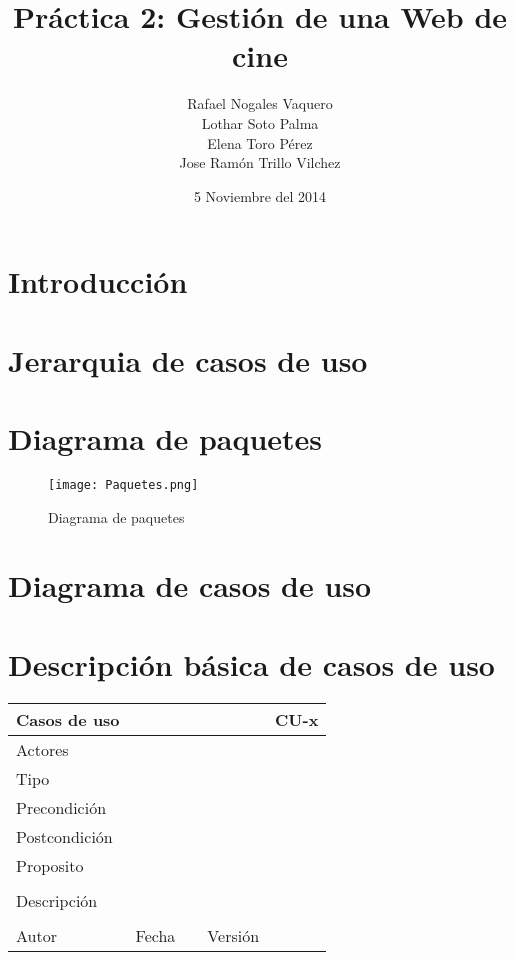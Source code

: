 \documentclass{article}
\title{Práctica 2: Gestión de una Web de cine}
\author{Rafael Nogales Vaquero
\\Lothar Soto Palma
\\Elena Toro Pérez
\\Jose Ramón Trillo Vilchez}
\date{5 Noviembre del 2014}
\begin{document}
\maketitle

\section{Introducción}
\section{Jerarquia de casos de uso}
\section{Diagrama de paquetes}
\begin{figure}[!ht]
\begin{center}
  \texttt{[image: Paquetes.png]}
  \caption{Diagrama de paquetes}
\end{center}
\end{figure}

\section{Diagrama de casos de uso}
\section{Descripción básica de casos de uso}


\begin{table}[h]
\begin{tabular}{|l|l|l|l|l|l|}
\hline
\multicolumn{2}{|p{2cm}|}{Casos de uso}  & \multicolumn{3}{p{7cm}|}{} & CU-x \\
\hline
\multicolumn{2}{|p{2cm}|}{Actores}       & \multicolumn{4}{p{8cm}|}{}        \\
\hline
\multicolumn{2}{|p{2cm}|}{Tipo}          & \multicolumn{4}{p{8cm}|}{}        \\
\hline
\multicolumn{2}{|p{2cm}|}{Precondición}  & \multicolumn{4}{p{8cm}|}{}        \\
\hline
\multicolumn{2}{|p{2cm}|}{Postcondición} & \multicolumn{4}{p{8cm}|}{}        \\
\hline
\multicolumn{6}{|p{10cm}|}{Proposito}                                   \\
\hline
\multicolumn{6}{|p{10cm}|}{}                                            \\
\hline
\multicolumn{6}{|p{10cm}|}{Descripción}                                 \\
\hline
\multicolumn{6}{|p{10cm}|}{}                                            \\
\hline
Autor              &              & Fecha    &     &   Versión  &\\     
\hline
\end{tabular}
\end{table}
\end{document}
